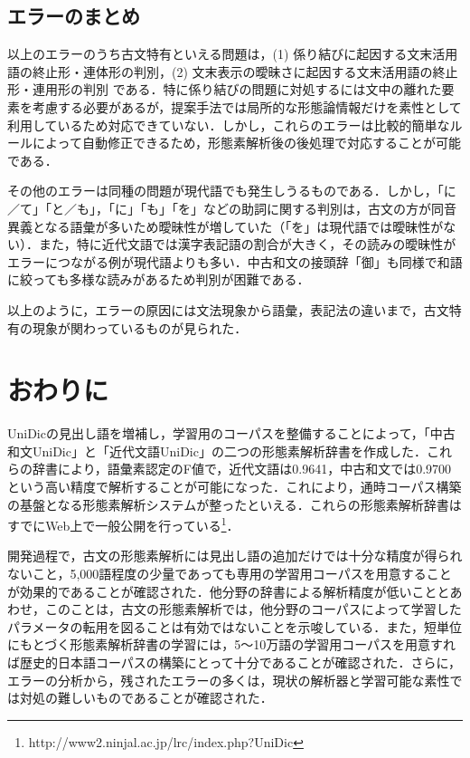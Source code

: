 \documentclass[japanese]{jnlp_1.4}
\begin{document}
\subsection{エラーのまとめ}

以上のエラーのうち古文特有といえる問題は，(1) 係り結びに起因する文末活用語の終止形・連体形の判別，(2) 文末表示の曖昧さに起因する文末活用語の終止形・連用形の判別 である．特に係り結びの問題に対処するには文中の離れた要素を考慮する必要があるが，提案手法では局所的な形態論情報だけを素性として利用しているため対応できていない．しかし，これらのエラーは比較的簡単なルールによって自動修正できるため，形態素解析後の後処理で対応することが可能である． 

その他のエラーは同種の問題が現代語でも発生しうるものである．しかし，「に／て」「と／も」，「に」「も」「を」などの助詞に関する判別は，古文の方が同音異義となる語彙が多いため曖昧性が増していた（「を」は現代語では曖昧性がない）．また，特に近代文語では漢字表記語の割合が大きく，その読みの曖昧性がエラーにつながる例が現代語よりも多い．中古和文の接頭辞「御」も同様で和語に絞っても多様な読みがあるため判別が困難である．

以上のように，エラーの原因には文法現象から語彙，表記法の違いまで，古文特有の現象が関わっているものが見られた．



\section{おわりに}

UniDicの見出し語を増補し，学習用のコーパスを整備することによって，「中古和文UniDic」と「近代文語UniDic」の二つの形態素解析辞書を作成した．これらの辞書により，語彙素認定のF値で，近代文語は0.9641，中古和文では0.9700という高い精度で解析することが可能になった．これにより，通時コーパス構築の基盤となる形態素解析システムが整ったといえる．これらの形態素解析辞書はすでにWeb上で一般公開を行っている\footnote{http://www2.ninjal.ac.jp/lrc/index.php?UniDic}．

開発過程で，古文の形態素解析には見出し語の追加だけでは十分な精度が得られないこと，5,000語程度の少量であっても専用の学習用コーパスを用意することが効果的であることが確認された．他分野の辞書による解析精度が低いこととあわせ，このことは，古文の形態素解析では，他分野のコーパスによって学習したパラメータの転用を図ることは有効ではないことを示唆している．また，短単位にもとづく形態素解析辞書の学習には，5〜10万語の学習用コーパスを用意すれば歴史的日本語コーパスの構築にとって十分であることが確認された．さらに，エラーの分析から，残されたエラーの多くは，現状の解析器と学習可能な素性では対処の難しいものであることが確認された．
\end{document}
